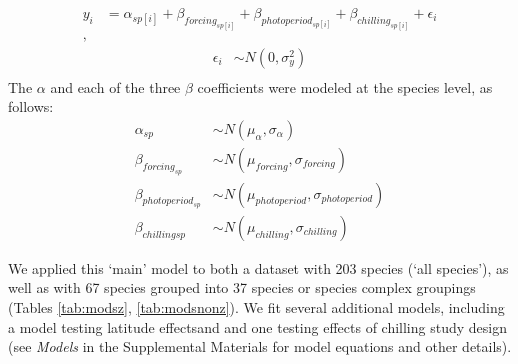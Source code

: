 \documentclass{article}
\begin{document}
\begin{align*}
y_i &= \alpha_{sp[i]} + \beta_{forcing_{sp[i]}} + \beta_{photoperiod_{sp[i]}} + \beta_{chilling_{sp[i]}} + \epsilon_i\\,
\end{align*}
\begin{align*}
\epsilon_i & \sim N(0,\sigma^2_y) \\
\end{align*}
\noindent The $\alpha$ and each of the three $\beta$ coefficients were modeled at the species level, as follows:
\begin{align*}
\alpha_{sp} & \sim N(\mu_{\alpha}, \sigma_{\alpha}) \\
\beta_{forcing_{sp}} & \sim N(\mu_{forcing}, \sigma_{forcing}) \\
\beta_{photoperiod_{sp}} & \sim N(\mu_{photoperiod}, \sigma_{photoperiod})\\
\beta_{chilling{sp}} & \sim N(\mu_{chilling}, \sigma_{chilling})
\end{align*}

We applied this `main' model to both a dataset with 203 species (`all species'), as well as with 67 species grouped into 37 species or species complex groupings (Tables \ref{tab:modsz}, \ref{tab:modsnonz}).  We fit several additional models, including a model testing latitude effectsand and one testing effects of chilling study design (see \emph{Models} in the Supplemental Materials for model equations and other details).
\end{document}
